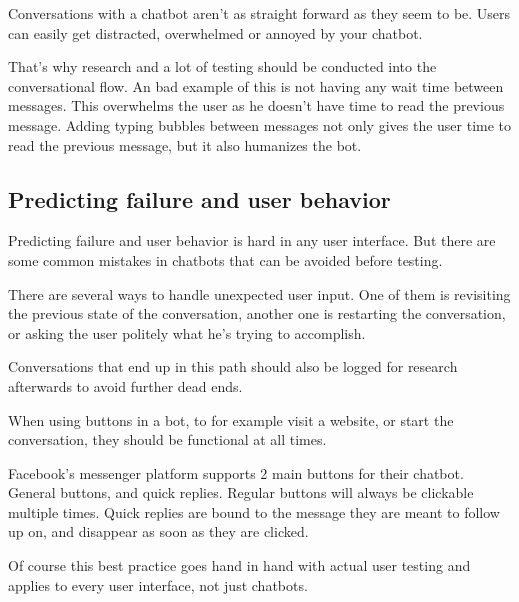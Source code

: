 Conversations with a chatbot aren't as straight forward as they seem to be. Users can easily get distracted, overwhelmed or annoyed by your chatbot.

That's why research and a lot of testing should be conducted into the conversational flow. An bad example of this is not having any wait time between messages. This overwhelms the user as he doesn't have time to read the previous message. Adding typing bubbles between messages not only gives the user time to read the previous message, but it also humanizes the bot.

\subsection{Predicting failure and user behavior}

Predicting failure and user behavior is hard in any user interface. But there are some common mistakes in chatbots that can be avoided before testing.

There are several ways to handle unexpected user input.
One of them is revisiting the previous state of the conversation, another one is restarting the conversation, or asking the user politely what he's trying to accomplish.

Conversations that end up in this path should also be logged for research afterwards to avoid further dead ends.

When using buttons in a bot, to for example visit a website, or start the conversation, they should be functional at all times.

Facebook's messenger platform supports 2 main buttons for their chatbot. General buttons, and quick replies. Regular buttons will always be clickable multiple times. Quick replies are bound to the message they are meant to follow up on, and disappear as soon as they are clicked.

Of course this best practice goes hand in hand with actual user testing and applies to every user interface, not just chatbots.